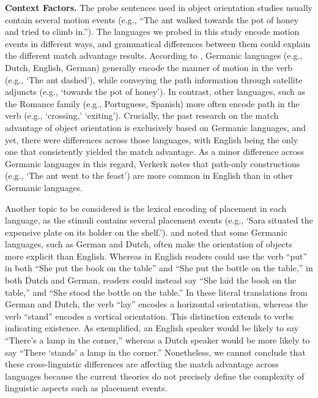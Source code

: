 \documentclass[
  man,floatsintext]{apa6}
\begin{document}
\textbf{Context Factors.} The probe sentences used in object orientation studies usually contain several motion events (e.g., ``The ant walked towards the pot of honey and tried to climb in.''). The languages we probed in this study encode motion events in different ways, and grammatical differences between them could explain the different match advantage results. According to \textcite{verkerkEvolutionaryDynamicsMotion2014}, Germanic languages (e.g., Dutch, English, German) generally encode the manner of motion in the verb (e.g., `The ant dashed'), while conveying the path information through satellite adjuncts (e.g., `towards the pot of honey'). In contrast, other languages, such as the Romance family (e.g., Portuguese, Spanish) more often encode path in the verb (e.g., `crossing,' `exiting'). Crucially, the past research on the match advantage of object orientation is exclusively based on Germanic languages, and yet, there were differences across those languages, with English being the only one that consistently yielded the match advantage. As a minor difference across Germanic languages in this regard, Verkerk notes that path-only constructions (e.g., `The ant went to the feast') are more common in English than in other Germanic languages.

Another topic to be considered is the lexical encoding of placement in each language, as the stimuli contains several placement events (e.g., `Sara situated the expensive plate on its holder on the shelf.'). \textcite{chenDoesObjectSize2020} and \textcite{kosterMentalSimulationObject2018} noted that some Germanic languages, such as German and Dutch, often make the orientation of objects more explicit than English. Whereas in English readers could use the verb ``put'' in both ``She put the book on the table'' and ``She put the bottle on the table,'' in both Dutch and German, readers could instead say ``She laid the book on the table,'' and ``She stood the bottle on the table.'' In these literal translations from German and Dutch, the verb ``lay'' encodes a horizontal orientation, whereas the verb ``stand'' encodes a vertical orientation. This distinction extends to verbs indicating existence. As \textcite{newmanCrosslinguisticOverviewPosture2002} exemplified, an English speaker would be likely to say ``There's a lamp in the corner,'' whereas a Dutch speaker would be more likely to say ``There `stands' a lamp in the corner.'' Nonetheless, we cannot conclude that these cross-linguistic differences are affecting the match advantage across languages because the current theories \autocite[e.g., language and situated simulation,][]{barsalou_grounded_2008} do not precisely define the complexity of linguistic aspects such as placement events.
\end{document}
